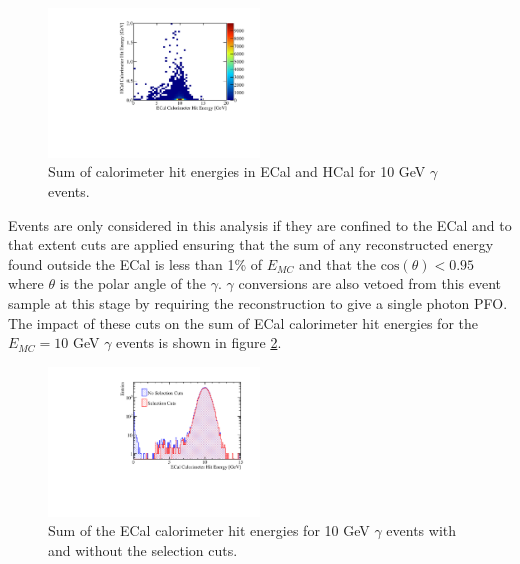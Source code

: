 \begin{figure}
\includegraphics[width=0.5\textwidth]{EnergyEstimators/Plots/Calibration/Digitsation/ECal/ECalHCalPhotonSplit.pdf}
\caption[Sum of calorimeter hit energies in ECal and HCal for 10 GeV $\gamma$ events.]{Sum of calorimeter hit energies in ECal and HCal for 10 GeV $\gamma$ events.}
\label{fig:ecaldigiphotonsplit}
\end{figure}

Events are only considered in this analysis if they are confined to the ECal and to that extent cuts are applied ensuring that the sum of any reconstructed energy found outside the ECal is less than 1\% of $E_{MC}$ and that the $\text{cos}(\theta) < 0.95$ where $\theta$ is the polar angle of the $\gamma$.  $\gamma$ conversions are also vetoed from this event sample at this stage by requiring the reconstruction to give a single photon PFO.  The impact of these cuts on the sum of ECal calorimeter hit energies for the $E_{MC} = 10$ GeV $\gamma$ events is shown in figure \ref{fig:ecaldigiselection}.

\begin{figure}
\includegraphics[width=0.5\textwidth]{EnergyEstimators/Plots/Calibration/Digitsation/ECal/DigitisationECalSelection.pdf}
\caption[Sum of the ECal calorimeter hit energies for 10 GeV $\gamma$ events with and without the selection cuts.]{Sum of the ECal calorimeter hit energies for 10 GeV $\gamma$ events with and without the selection cuts.}
\label{fig:ecaldigiselection}
\end{figure}

